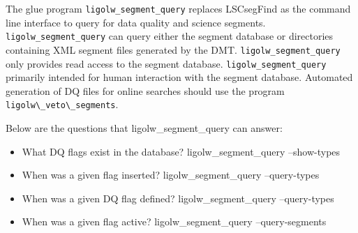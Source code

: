 The glue program \verb|ligolw_segment_query| replaces LSCsegFind as the
command line interface to query for data quality and science segments.
\verb|ligolw_segment_query| can query either the segment database or
directories containing XML segment files generated by the DMT.
\verb|ligolw_segment_query| only provides read access to the segment database.
\verb|ligolw_segment_query| primarily intended for human interaction with the
segment database. Automated generation of DQ files for online searches should
use the program \verb|ligolw\_veto\_segments|.

Below are the questions that ligolw\_segment\_query can answer:
\begin{itemize}
\item What DQ flags exist in the database? ligolw\_segment\_query --show-types
\item When was a given flag inserted? ligolw\_segment\_query --query-types
\item When was a given DQ flag deﬁned? ligolw\_segment\_query --query-types
\item When was a given flag active? ligolw\_segment\_query --query-segments 
\end{itemize}


